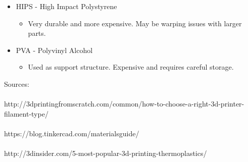 \documentclass{article}
\begin{document}
\begin{itemize}

\item HIPS - High Impact Polystyrene

\begin{itemize}

\item Very durable and more expensive. May be warping issues with larger parts. 

\end{itemize}

\end{itemize}



\begin{itemize}

\item PVA - Polyvinyl Alcohol

\begin{itemize}

\item Used as support structure. Expensive and requires careful storage. \\

\end{itemize}

\end{itemize}


Sources:\\\\
http://3dprintingfromscratch.com/common/how-to-choose-a-right-3d-printer-filament-type/\\\\
https://blog.tinkercad.com/materialsguide/\\\\
http://3dinsider.com/5-most-popular-3d-printing-thermoplastics/\\\\
\end{document}
